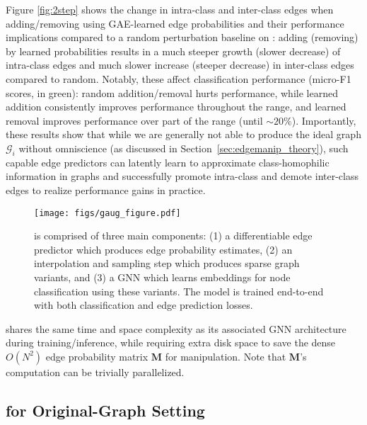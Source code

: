\documentclass[letterpaper]{article} \usepackage{aaai21}  \usepackage{times}  \usepackage{helvet} \usepackage{courier}  \usepackage[hyphens]{url}  \usepackage{graphicx} \urlstyle{rm} \def\UrlFont{\rm}  \usepackage{natbib}  \usepackage{caption} \frenchspacing  \setlength{\pdfpagewidth}{8.5in}  \setlength{\pdfpageheight}{11in}
\begin{document}
Figure \ref{fig:2step} shows the change in intra-class and inter-class edges when adding/removing using GAE-learned edge probabilities and their performance implications compared to a random perturbation baseline on \cora: adding (removing) by learned probabilities results in a much steeper growth (slower decrease) of intra-class edges and much slower increase (steeper decrease) in inter-class edges compared to random.  Notably, these affect classification performance (micro-F1 scores, in green): random addition/removal hurts performance, while learned addition consistently improves performance throughout the range, and learned removal improves performance over part of the range (until ${\sim}20\%$). Importantly, these results show that while we are generally not able to produce the ideal graph $\mathcal{G}_i$ without omniscience (as discussed in Section~\ref{sec:edgemanip_theory}), such capable edge predictors can latently learn to approximate class-homophilic information in graphs and successfully promote intra-class and demote inter-class edges to realize performance gains in practice. 

\begin{figure*}[t]
    \centering
    \texttt{[image: figs/gaug\_figure.pdf]}
    \caption{\method is comprised of three main components: (1) a differentiable edge predictor which produces edge probability estimates, (2) an interpolation and sampling step which produces sparse graph variants, and (3) a GNN which learns embeddings for node classification using these variants.  The model is trained end-to-end with both classification and edge prediction losses.
    } \label{fig:gaug}
\end{figure*}

\methodtwo shares the same time and space complexity as its associated GNN architecture during training/inference, while requiring extra disk space to save the dense $O(N^2)$ edge probability matrix $\mathbf{M}$ for manipulation. Note that $\mathbf{M}$'s computation can be trivially parallelized. 





\subsection{\method for Original-Graph Setting}
\end{document}
